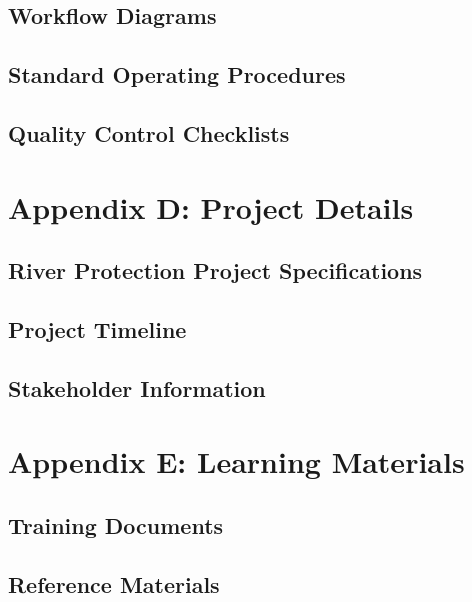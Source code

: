 \subsection{Workflow Diagrams}

\subsection{Standard Operating Procedures}

\subsection{Quality Control Checklists}

\section{Appendix D: Project Details}

\subsection{River Protection Project Specifications}

\subsection{Project Timeline}

\subsection{Stakeholder Information}

\section{Appendix E: Learning Materials}

\subsection{Training Documents}

\subsection{Reference Materials}

